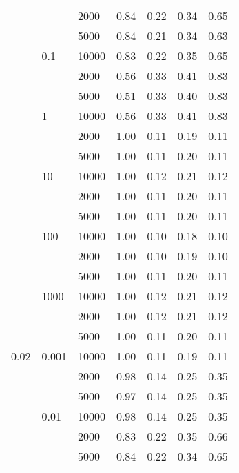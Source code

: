 \begin{tabular}{lllrrrr}
      &       & 2000 &       0.84 &       0.22 &       0.34 &       0.65 \\
      &       & 5000 &       0.84 &       0.21 &       0.34 &       0.63 \\
      & 0.1 & 10000 &       0.83 &       0.22 &       0.35 &       0.65 \\
      &       & 2000 &       0.56 &       0.33 &       0.41 &       0.83 \\
      &       & 5000 &       0.51 &       0.33 &       0.40 &       0.83 \\
      & 1 & 10000 &       0.56 &       0.33 &       0.41 &       0.83 \\
      &       & 2000 &       1.00 &       0.11 &       0.19 &       0.11 \\
      &       & 5000 &       1.00 &       0.11 &       0.20 &       0.11 \\
      & 10 & 10000 &       1.00 &       0.12 &       0.21 &       0.12 \\
      &       & 2000 &       1.00 &       0.11 &       0.20 &       0.11 \\
      &       & 5000 &       1.00 &       0.11 &       0.20 &       0.11 \\
      & 100 & 10000 &       1.00 &       0.10 &       0.18 &       0.10 \\
      &       & 2000 &       1.00 &       0.10 &       0.19 &       0.10 \\
      &       & 5000 &       1.00 &       0.11 &       0.20 &       0.11 \\
      & 1000 & 10000 &       1.00 &       0.12 &       0.21 &       0.12 \\
      &       & 2000 &       1.00 &       0.12 &       0.21 &       0.12 \\
      &       & 5000 &       1.00 &       0.11 &       0.20 &       0.11 \\
0.02 & 0.001 & 10000 &       1.00 &       0.11 &       0.19 &       0.11 \\
      &       & 2000 &       0.98 &       0.14 &       0.25 &       0.35 \\
      &       & 5000 &       0.97 &       0.14 &       0.25 &       0.35 \\
      & 0.01 & 10000 &       0.98 &       0.14 &       0.25 &       0.35 \\
      &       & 2000 &       0.83 &       0.22 &       0.35 &       0.66 \\
      &       & 5000 &       0.84 &       0.22 &       0.34 &       0.65 \\

\end{tabular}

